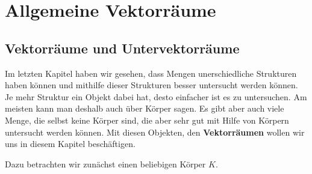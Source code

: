 

\chapter{Allgemeine Vektorräume}

\section{Vektorräume und Untervektorräume}\label{secton_vr_uvr}

\setcounter{definition}{0}
\setcounter{beispiel}{0}
\setcounter{notiz}{0}

Im letzten Kapitel haben wir gesehen, dass Mengen unerschiedliche Strukturen haben können 
und mithilfe dieser Strukturen besser untersucht werden können. Je mehr Struktur ein Objekt 
dabei hat, desto einfacher ist es zu untersuchen. Am meisten kann man deshalb auch über 
Körper sagen. Es gibt aber auch viele Menge, die selbst keine Körper sind, die aber sehr gut mit 
Hilfe von Körpern untersucht werden können. Mit diesen Objekten, den 
\textbf{Vektorräumen} wollen wir uns in diesem Kapitel beschäftigen. 

Dazu betrachten wir zunächst einen beliebigen Körper $K$. 

%


